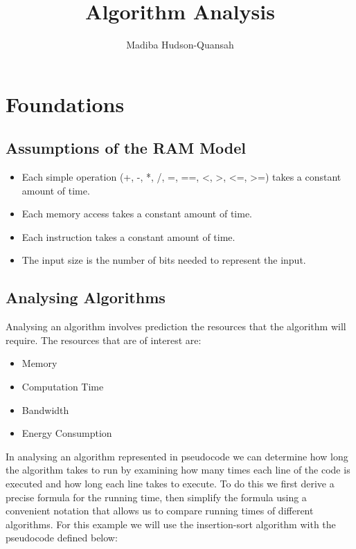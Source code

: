 \documentclass[12pt letter]{report}
\title{\Huge{Algorithm Analysis}}
\author{\huge{Madiba Hudson-Quansah}}
\date{}
\begin{document}
\maketitle
\newpage
{}
\tableofcontents
\pagebreak

\chapter{Foundations}

\section{Assumptions of the RAM Model}

\begin{itemize}
  \item Each simple operation (+, -, *, /, =, ==, \textless, \textgreater, \textless=, \textgreater=) takes a constant amount of time.
  \item Each memory access takes a constant amount of time.
  \item Each instruction takes a constant amount of time.
  \item The input size is the number of bits needed to represent the input.
\end{itemize}

\section{Analysing Algorithms}



Analysing an algorithm involves prediction the resources that the algorithm will require. The resources that are of interest are:
\begin{itemize}
  \item Memory
  \item Computation Time
  \item Bandwidth
  \item Energy Consumption
\end{itemize}

In analysing an algorithm represented in pseudocode we can determine how long the algorithm takes to run by examining
how many times each line of the code is executed  and how long each line takes to execute. To do this we first derive a
precise formula for the running time, then simplify the formula using a convenient notation that allows us to compare
running times of different algorithms. For this example we will use the insertion-sort algorithm with the pseudocode
defined below:
\end{document}
